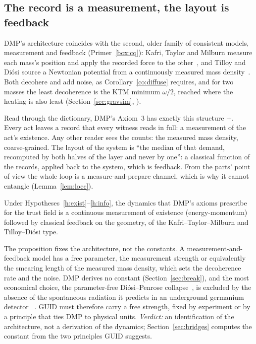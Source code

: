 \subsection{The record is a measurement, the layout is feedback}

DMP's architecture coincides with the second, older family of consistent models, measurement and feedback (Primer~\ref{box:cq}): Kafri,
Taylor and Milburn measure each mass's position and apply the recorded force to the other~\cite{ktm}, and Tilloy and Di\'osi source a
Newtonian potential from a continuously measured mass density~\cite{tilloydiosi}. Both decohere and add noise, as
Corollary~\ref{co:diffuse} requires, and for two masses the least decoherence is the KTM minimum $\omega/2$, reached where the heating
is also least (Section~\ref{sec:gravsim}, ).

Read through the dictionary, DMP's Axiom~3 has exactly this structure \tagD+\tagH. Every act leaves a record that every witness reads in
full: a measurement of the act's existence. Any other reader sees the counts: the measured mass density, coarse-grained. The layout of the
system is ``the median of that demand, recomputed by both halves of the layer and never by one'': a classical function of the records,
applied back to the system, which is feedback. From the parts' point of view the whole loop is a measure-and-prepare channel, which is why
it cannot entangle (Lemma~\ref{lem:locc}).

\begin{proposition}\label{pr:ktm}
Under Hypotheses~\ref{h:exist}--\ref{h:info}, the dynamics that DMP's axioms prescribe for the trust field is a continuous measurement of
existence (energy-momentum) followed by classical feedback on the geometry, of the Kafri--Taylor--Milburn and Tilloy--Di\'osi type.
\end{proposition}

The proposition fixes the architecture, not the constants. A measurement-and-feedback model has a free parameter, the measurement strength
or equivalently the smearing length of the measured mass density, which sets the decoherence rate and the noise. DMP derives no constant
(Section~\ref{sec:break}), and the most economical choice, the parameter-free Di\'osi--Penrose collapse~\cite{diosi87,penrose96}, is
excluded by the absence of the spontaneous radiation it predicts in an underground germanium detector~\cite{donadi} \tagP. GUID must
therefore carry a free strength, fixed by experiment or by a principle that ties DMP to physical units. \emph{Verdict:} an identification \tagH{} of
the architecture, not a derivation of the dynamics; Section~\ref{sec:bridges} computes the constant from the two principles GUID
suggests.

